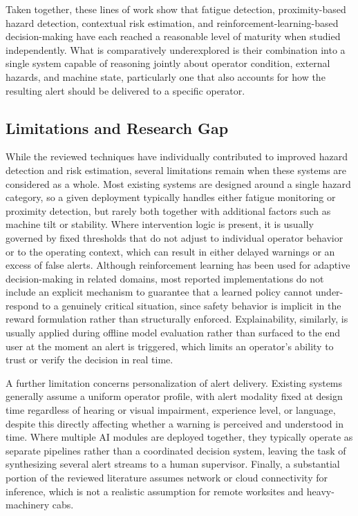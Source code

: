 Taken together, these lines of work show that fatigue detection, proximity-based hazard detection, contextual risk estimation, and reinforcement-learning-based decision-making have each reached a reasonable level of maturity when studied independently. What is comparatively underexplored is their combination into a single system capable of reasoning jointly about operator condition, external hazards, and machine state, particularly one that also accounts for how the resulting alert should be delivered to a specific operator.

\subsection{Limitations and Research Gap}

While the reviewed techniques have individually contributed to improved hazard detection and risk estimation, several limitations remain when these systems are considered as a whole. Most existing systems are designed around a single hazard category, so a given deployment typically handles either fatigue monitoring or proximity detection, but rarely both together with additional factors such as machine tilt or stability. Where intervention logic is present, it is usually governed by fixed thresholds that do not adjust to individual operator behavior or to the operating context, which can result in either delayed warnings or an excess of false alerts. Although reinforcement learning has been used for adaptive decision-making in related domains, most reported implementations do not include an explicit mechanism to guarantee that a learned policy cannot under-respond to a genuinely critical situation, since safety behavior is implicit in the reward formulation rather than structurally enforced. Explainability, similarly, is usually applied during offline model evaluation rather than surfaced to the end user at the moment an alert is triggered, which limits an operator's ability to trust or verify the decision in real time.

A further limitation concerns personalization of alert delivery. Existing systems generally assume a uniform operator profile, with alert modality fixed at design time regardless of hearing or visual impairment, experience level, or language, despite this directly affecting whether a warning is perceived and understood in time. Where multiple AI modules are deployed together, they typically operate as separate pipelines rather than a coordinated decision system, leaving the task of synthesizing several alert streams to a human supervisor. Finally, a substantial portion of the reviewed literature assumes network or cloud connectivity for inference, which is not a realistic assumption for remote worksites and heavy-machinery cabs.

